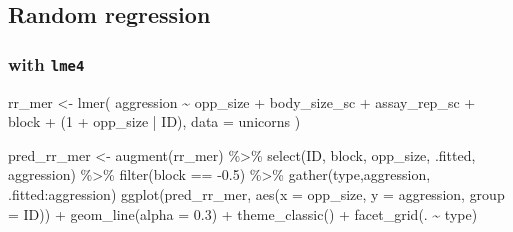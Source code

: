\documentclass[
  12pt,
]{book}
\newenvironment{Shaded}{\begin{snugshade}}{\end{snugshade}}
\newcommand{\AttributeTok}[1]{\textcolor[rgb]{0.77,0.63,0.00}{#1}}
\newcommand{\DecValTok}[1]{\textcolor[rgb]{0.00,0.00,0.81}{#1}}
\newcommand{\FloatTok}[1]{\textcolor[rgb]{0.00,0.00,0.81}{#1}}
\newcommand{\FunctionTok}[1]{\textcolor[rgb]{0.00,0.00,0.00}{#1}}
\newcommand{\NormalTok}[1]{#1}
\newcommand{\OtherTok}[1]{\textcolor[rgb]{0.56,0.35,0.01}{#1}}
\newcommand{\SpecialCharTok}[1]{\textcolor[rgb]{0.00,0.00,0.00}{#1}}
\newcommand{\StringTok}[1]{\textcolor[rgb]{0.31,0.60,0.02}{#1}}
\begin{document}
\hypertarget{random-regression}{%
\subsection{Random regression}\label{random-regression}}

\hypertarget{with-lme4}{%
\subsubsection{\texorpdfstring{with \texttt{lme4}}{with lme4}}\label{with-lme4}}

\begin{Shaded}
\begin{Highlighting}[]
\NormalTok{rr\_mer }\OtherTok{\textless{}{-}} \FunctionTok{lmer}\NormalTok{(}
\NormalTok{  aggression }\SpecialCharTok{\textasciitilde{}}\NormalTok{ opp\_size }\SpecialCharTok{+}\NormalTok{ body\_size\_sc }\SpecialCharTok{+}\NormalTok{ assay\_rep\_sc }\SpecialCharTok{+}\NormalTok{ block}
  \SpecialCharTok{+}\NormalTok{ (}\DecValTok{1} \SpecialCharTok{+}\NormalTok{ opp\_size }\SpecialCharTok{|}\NormalTok{ ID),}
  \AttributeTok{data =}\NormalTok{ unicorns}
\NormalTok{)}
\end{Highlighting}
\end{Shaded}

\begin{Shaded}
\begin{Highlighting}[]
\NormalTok{pred\_rr\_mer }\OtherTok{\textless{}{-}} \FunctionTok{augment}\NormalTok{(rr\_mer) }\SpecialCharTok{\%\textgreater{}\%}
  \FunctionTok{select}\NormalTok{(ID, block, opp\_size, .fitted, aggression) }\SpecialCharTok{\%\textgreater{}\%}
  \FunctionTok{filter}\NormalTok{(block }\SpecialCharTok{==} \SpecialCharTok{{-}}\FloatTok{0.5}\NormalTok{) }\SpecialCharTok{\%\textgreater{}\%}
  \FunctionTok{gather}\NormalTok{(type,aggression, }\StringTok{\textasciigrave{}}\AttributeTok{.fitted}\StringTok{\textasciigrave{}}\SpecialCharTok{:}\NormalTok{aggression)}
\FunctionTok{ggplot}\NormalTok{(pred\_rr\_mer, }\FunctionTok{aes}\NormalTok{(}\AttributeTok{x =}\NormalTok{ opp\_size, }\AttributeTok{y =}\NormalTok{ aggression, }\AttributeTok{group =}\NormalTok{ ID)) }\SpecialCharTok{+}
  \FunctionTok{geom\_line}\NormalTok{(}\AttributeTok{alpha =} \FloatTok{0.3}\NormalTok{) }\SpecialCharTok{+}
  \FunctionTok{theme\_classic}\NormalTok{() }\SpecialCharTok{+}
  \FunctionTok{facet\_grid}\NormalTok{(. }\SpecialCharTok{\textasciitilde{}}\NormalTok{ type)}
\end{Highlighting}
\end{Shaded}
\end{document}
